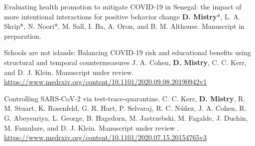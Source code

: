 \begin{cventries}
  \cvpublicationentrytwo
    {Evaluating health promotion to mitigate COVID-19 in Senegal: the impact of more intentional interactions for positive behavior change} %
    {\textbf{D. Mistry}*, L. A. Skrip*, N. Noori*, M. Sall, I. Ba, A. Oron, and B. M. Althouse.} %
    {} %
    {} %
    {} %
    {} %
    {} %
    {Manuscript in preparation.} %
    {} %
    \vspace{1.5mm}

  \cvpublicationentrytwo
    {Schools are not islands: Balancing COVID-19 risk and educational benefits using structural and temporal countermeasures} %
    {J. A. Cohen, \textbf{D. Mistry}, C. C. Kerr, and D. J. Klein.} %
    {} %
    {} %
    {} %
    {} %
    {} %
    {Manuscript under review.} %
    {\href{https://www.medrxiv.org/content/10.1101/2020.09.08.20190942v1}{https://www.medrxiv.org/content/10.1101/2020.09.08.20190942v1 \faLink\acvHeaderIconSep}} %
    \vspace{1.5mm}

  \cvpublicationentrytwo
    {Controlling SARS-CoV-2 via test-trace-quarantine.} %
    {C. C. Kerr, \textbf{D. Mistry},  R. M. Stuart, K. Rosenfeld, G. R. Hart, P. Selvaraj, R. C. N\'{u}\~{n}ez, J. A. Cohen, R. G. Abeysuriya, L. George, B. Hagedorn, M. Jastrzebski, M. Fagalde, J. Duchin, M. Famulare, and D. J. Klein.} %
    {} %
    {} %
    {} %
    {} %
    {} %
    {Manuscript under review
    .} %
    {\href{https://www.medrxiv.org/content/10.1101/2020.07.15.20154765v3}{https://www.medrxiv.org/content/10.1101/2020.07.15.20154765v3 \faLink\acvHeaderIconSep}} %
    \vspace{.5mm}



\end{cventries}

